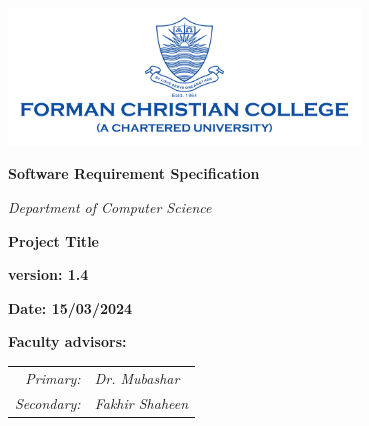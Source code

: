 
\begin{titlepage}
    \centering
    \vspace*{1cm}
    \includegraphics[width=0.7\textwidth]{./images/fcc_logo} %
    \vspace{1.5cm}

    {\LARGE\bfseries Software Requirement Specification\par}
    \vspace{0.5cm}
    {\Large\itshape Department of Computer Science\par}
    \vspace{1.5cm}
    {\Huge\bfseries Project Title\par}
    \vspace{1.5cm}
    {\Large\bfseries version: 1.4\par}
    \vspace{0.5cm}
    {\Large\bfseries Date: 15/03/2024\par}
    \vspace{1cm}

    {\Large\bfseries Faculty advisors:\par}

    \begin{center}
    \begin{tabular}{r l}
        \textit{Primary:} & \textit{Dr. Mubashar} \\
        \textit{Secondary:} & \textit{Fakhir Shaheen} \\
    \end{tabular}
    \end{center}


\end{titlepage}
